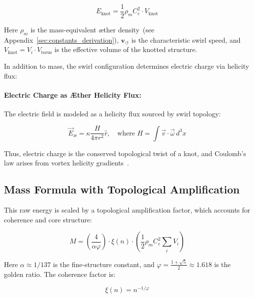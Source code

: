 \documentclass[preprint]{revtex4-2}
\begin{document}
    \begin{equation}
    E_{\text{knot}} = \frac{1}{2} \rho_{\scriptscriptstyle\boldsymbol\!m} C_e^2 \cdot V_{\text{knot}}
    \label{eq:raw_swirl_energy}
    \end{equation}

    Here \( \rho_{\scriptscriptstyle\boldsymbol\!m} \) is the mass-equivalent æther density~(see Appendix~\ref{sec:constants_derivation}), \( \mathbf{v}_{\scriptscriptstyle\boldsymbol{\circlearrowleft}} \) is the characteristic swirl speed, and \( V_{\text{knot}} = V_i \cdot V_{\text{torus}} \) is the effective volume of the knotted structure.

    In addition to mass, the swirl configuration determines electric charge via helicity flux:

    \paragraph{Electric Charge as Æther Helicity Flux:}
    The electric field is modeled as a helicity flux sourced by swirl topology:

    \begin{equation}
        \vec{E}_{\text{\ae}} = \kappa \frac{H}{4\pi r^2} \hat{r}, \quad \text{where } H = \int \vec{v} \cdot \vec{\omega} \, d^3x
    \end{equation}

    Thus, electric charge is the conserved topological twist of a knot, and Coulomb’s law arises from vortex helicity gradients~\cite{ranada1992knots}.

    \subsection{Mass Formula with Topological Amplification}
    This raw energy is scaled by a topological amplification factor, which accounts for coherence and core structure:

    \begin{equation}
    M = \left( \frac{4}{\alpha \varphi} \right) \cdot \xi(n) \cdot \left( \frac{1}{2} \rho_{\scriptscriptstyle\boldsymbol\!m} C_e^2 \sum_i V_i \right)
    \label{eq:mass_formula_basic}
    \end{equation}

    Here \( \alpha \approx 1/137 \) is the fine-structure constant, and \( \varphi = \frac{1 + \sqrt{5}}{2} \approx 1.618 \) is the golden ratio. The coherence factor is:

    \begin{equation}
    \xi(n) = n^{-1/\varphi}
    \label{eq:coherence_factor}
    \end{equation}
\end{document}
